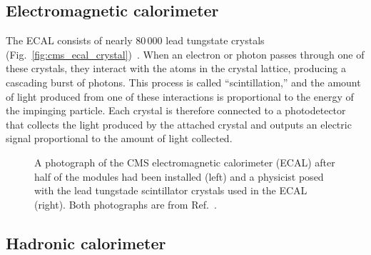 \subsection{Electromagnetic calorimeter}
The ECAL consists of nearly 80\,000 lead tungstate crystals (Fig.~\ref{fig:cms_ecal_crystal})~\cite{CMSWebECAL}. 
When an electron or photon passes through one of these crystals, they interact with the atoms in the crystal lattice, producing a cascading burst of photons. 
This process is called ``scintillation,'' and the amount of light produced from one of these interactions is proportional to the energy of the impinging particle. 
Each crystal is therefore connected to a photodetector that collects the light produced by the attached crystal and outputs an electric signal proportional to the amount of light collected. 

\begin{figure}[htb]
    \centering
    \quad
    \caption{
        A photograph of the CMS electromagnetic calorimeter (ECAL) after half of the modules had been installed (left) and a physicist posed with the lead tungstade scintillator crystals used in the ECAL (right). 
        Both photographs are from Ref.~\cite{Brice:1431477}.
    }
    \label{fig:cms_ecal}
\end{figure}

\subsection{Hadronic calorimeter}


